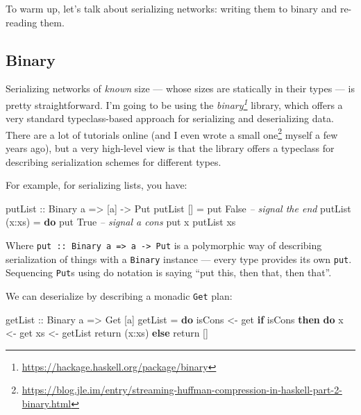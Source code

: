 \documentclass[]{article}
\newenvironment{Shaded}{}{}
\newcommand{\KeywordTok}[1]{\textcolor[rgb]{0.00,0.44,0.13}{\textbf{{#1}}}}
\newcommand{\DataTypeTok}[1]{\textcolor[rgb]{0.56,0.13,0.00}{{#1}}}
\newcommand{\CommentTok}[1]{\textcolor[rgb]{0.38,0.63,0.69}{\textit{{#1}}}}
\newcommand{\OtherTok}[1]{\textcolor[rgb]{0.00,0.44,0.13}{{#1}}}
\newcommand{\FunctionTok}[1]{\textcolor[rgb]{0.02,0.16,0.49}{{#1}}}
\newcommand{\NormalTok}[1]{{#1}}
\renewcommand{\href}[2]{#2\footnote{\url{#1}}}
\begin{document}
To warm up, let's talk about serializing networks: writing them to binary and
re-reading them.

\subsection{Binary}\label{binary}

Serializing networks of \emph{known} size --- whose sizes are statically in
their types --- is pretty straightforward. I'm going to be using the
\emph{\href{https://hackage.haskell.org/package/binary}{binary}} library, which
offers a very standard typeclass-based approach for serializing and
deserializing data. There are a lot of tutorials online (and I even
\href{https://blog.jle.im/entry/streaming-huffman-compression-in-haskell-part-2-binary.html}{wrote
a small one} myself a few years ago), but a very high-level view is that the
library offers a typeclass for describing serialization schemes for different
types.

For example, for serializing lists, you have:

\begin{Shaded}
\begin{Highlighting}[]
\OtherTok{putList ::} \DataTypeTok{Binary} \NormalTok{a }\OtherTok{=>} \NormalTok{[a] }\OtherTok{->} \DataTypeTok{Put}
\NormalTok{putList []     }\FunctionTok{=}
    \NormalTok{put }\DataTypeTok{False}           \CommentTok{-- signal the end}
\NormalTok{putList (x}\FunctionTok{:}\NormalTok{xs) }\FunctionTok{=} \KeywordTok{do}
    \NormalTok{put }\DataTypeTok{True}            \CommentTok{-- signal a cons}
    \NormalTok{put x}
    \NormalTok{putList xs}
\end{Highlighting}
\end{Shaded}

Where \texttt{put\ ::\ Binary\ a\ =\textgreater{}\ a\ -\textgreater{}\ Put} is a
polymorphic way of describing serialization of things with a \texttt{Binary}
instance --- every type provides its own \texttt{put}. Sequencing \texttt{Put}s
using do notation is saying ``put this, then that, then that''.

We can deserialize by describing a monadic \texttt{Get} plan:

\begin{Shaded}
\begin{Highlighting}[]
\OtherTok{getList ::} \DataTypeTok{Binary} \NormalTok{a }\OtherTok{=>} \DataTypeTok{Get} \NormalTok{[a]}
\NormalTok{getList }\FunctionTok{=} \KeywordTok{do}
    \NormalTok{isCons }\OtherTok{<-} \NormalTok{get}
    \KeywordTok{if} \NormalTok{isCons}
      \KeywordTok{then} \KeywordTok{do}
        \NormalTok{x  }\OtherTok{<-} \NormalTok{get}
        \NormalTok{xs }\OtherTok{<-} \NormalTok{getList}
        \NormalTok{return (x}\FunctionTok{:}\NormalTok{xs)}
      \KeywordTok{else}
        \NormalTok{return []}
\end{Highlighting}
\end{Shaded}
\end{document}
